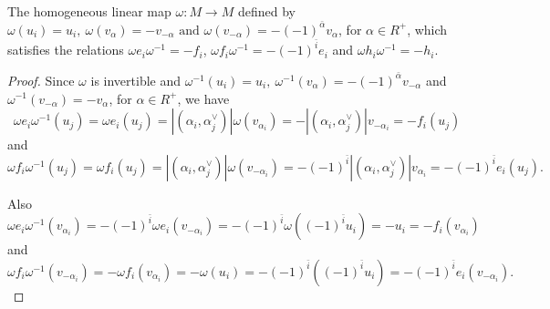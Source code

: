 \documentclass[10pt,a4paper]{amsart}
\newcommand{\al}{\alpha}
\newcommand{\om}{\omega}
\begin{document}
	\begin{lemma}\label{lem8}
		The homogeneous linear map $\om:M\rightarrow M$ defined by $\om(u_i)=u_i,~\om(v_{\al})=-v_{-\al}\text{ and }\om(v_{-\al})=-(-1)^{\bar{\al}}v_{\al}$, for $\al\in R^+$, which satisfies the relations $\om e_i\om^{-1}=-f_i$, $\om f_i\om^{-1}=-(-1)^{\bar{i}}e_i$ and $\om h_i\om^{-1}=-h_i$.
	\end{lemma}

	\begin{proof}
		Since $\om$ is invertible and $\om^{-1}(u_i)=u_i,~\om^{-1}(v_{\al})=-(-1)^{\bar{\al}}v_{-\al}$ and $\om^{-1}(v_{-\al})=-v_{\al}$, for $\al\in R^+$, we have
		$$\om e_i\om^{-1}(u_j)=\om e_i(u_j)=|(\al_i,\al_j^{\vee})|\om(v_{\al_i})=-|(\al_i,\al_j^{\vee})|v_{-\al_i}=-f_i(u_j)$$ and $$\om f_i\om^{-1}(u_j)=\om f_i(u_j)=|(\al_i,\al_j^{\vee})|\om(v_{-\al_i})=-(-1)^{\bar{i}}|(\al_i,\al_j^{\vee})|v_{\al_i}=-(-1)^{\bar{i}}e_i(u_j).$$ 
		
		Also $$\om e_i\om^{-1}(v_{\al_i})=-(-1)^{\bar{i}}\om e_i(v_{-\al_i})=-(-1)^{\bar{i}}\om((-1)^{\bar{i}}u_i)=-u_i=-f_i(v_{\al_i})$$ and $$\om f_i\om^{-1}(v_{-\al_i})=-\om f_i(v_{\al_i})=-\om(u_i)=-(-1)^{\bar{i}}((-1)^{\bar{i}}u_i)=-(-1)^{\bar{i}}e_i(v_{-\al_i}).$$
		

\end{proof}
\end{document}
